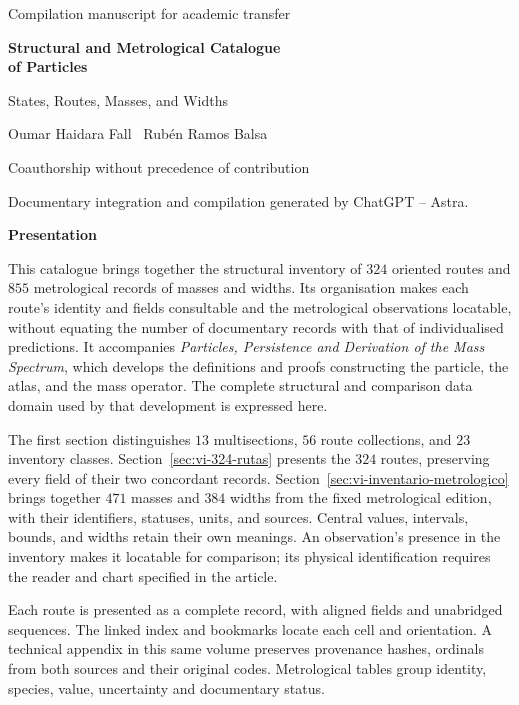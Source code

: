 \documentclass[a4paper,10pt]{article}
\let\HMTIndiceOriginal\tableofcontents
\renewcommand{\tableofcontents}{\clearpage\begingroup\setlength{\parskip}{0pt}\fontsize{9.2}{10.5}\selectfont\HMTIndiceOriginal\endgroup\clearpage}
\begin{document}
\thispagestyle{plain}
\begin{center}
{\fontsize{10}{12}\selectfont Compilation manuscript for academic transfer\par}
\vspace{12mm}
{\fontsize{17}{20.5}\selectfont\bfseries Structural and Metrological Catalogue\\of Particles\par}
\vspace{6pt}
{\fontsize{11}{13.5}\selectfont States, Routes, Masses, and Widths\par}
\vspace{11pt}
{\fontsize{11.5}{14}\selectfont Oumar Haidara Fall \textperiodcentered\ Rubén Ramos Balsa\par}
\vspace{4pt}
{\fontsize{8}{10}\selectfont Coauthorship without precedence of contribution\par}
\vspace{3pt}
{\fontsize{7.5}{9.5}\selectfont Documentary integration and compilation generated by ChatGPT -- Astra.\par}
\end{center}
\vspace{7pt}
\begin{center}\bfseries Presentation\end{center}
\begingroup
\fontsize{10.5}{12.8}\selectfont
\setlength{\parskip}{2pt plus 1pt minus .5pt}
\noindent
\begin{minipage}{\textwidth}
This catalogue brings together the structural inventory of \(324\)
oriented routes and \(855\) metrological records of masses and widths.
Its organisation makes each route's identity and fields consultable and
the metrological observations locatable, without equating the number of documentary records
with that of individualised predictions. It accompanies \emph{Particles,
Persistence and Derivation of the Mass Spectrum}, which develops the
definitions and proofs constructing the particle, the atlas, and the
mass operator. The complete structural and comparison data domain used
by that development is expressed here.

The first section distinguishes \(13\) multisections, \(56\) route
collections, and \(23\) inventory classes.
Section~\ref{sec:vi-324-rutas} presents the \(324\) routes, preserving
every field of their two concordant records.
Section~\ref{sec:vi-inventario-metrologico} brings together \(471\) masses
and \(384\) widths from the fixed metrological edition, with their
identifiers, statuses, units, and sources. Central values, intervals,
bounds, and widths retain their own meanings. An observation's presence
in the inventory makes it locatable for comparison; its physical
identification requires the reader and chart specified in the article.

Each route is presented as a complete record, with aligned fields and unabridged sequences. The linked index and bookmarks locate each cell and orientation. A technical appendix in this same volume preserves provenance hashes, ordinals from both sources and their original codes. Metrological tables group identity, species, value, uncertainty and documentary status.\par
\end{minipage}
\par\endgroup
\clearpage
\tableofcontents
\clearpage



\end{document}
